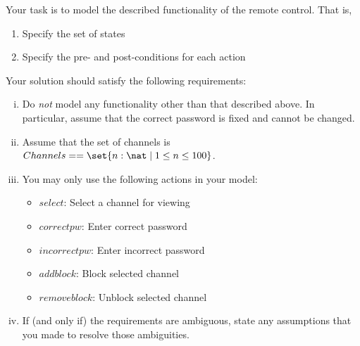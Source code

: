 \documentclass{article}
\begin{document}
\begin{enumerate}
Your task is to model the described functionality of the remote control. That is,
\begin{enumerate}
\item Specify the set of states

\item Specify the pre- and post-conditions for each action
\end{enumerate}

Your solution should satisfy the following requirements:
\begin{enumerate}[i.]
\item Do \emph{not} model any functionality other than that described above. In particular, assume that the correct password is fixed and cannot be changed.
\item Assume that the set of channels is $Channels == \set{n:\nat \mid 1 \leq n \leq 100}$.
\item You may only use the following actions in your model:
    \begin{itemize}
    \item $select$: Select a channel for viewing
    \item $correctpw$: Enter correct password
    \item $incorrectpw$: Enter incorrect password
    \item $addblock$: Block selected channel
    \item $removeblock$: Unblock selected channel
    \end{itemize}
\item If (and only if) the requirements are ambiguous, state any assumptions that you made to resolve those ambiguities.
\end{enumerate}


\end{enumerate}
\end{document}

